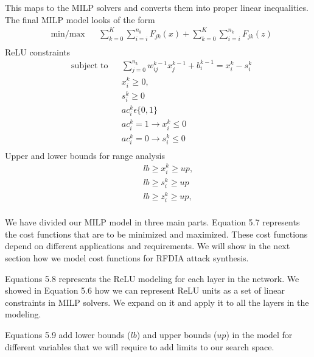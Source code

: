 This maps to the \ac{MILP} solvers and converts them into proper linear inequalities. 
The final \ac{MILP} model looks of the form
\begin{equation}
\begin{aligned}
& \underset{}{\text{min/max}}
& &  \sum_{k=0}^{K} \sum_{i=i}^{n_k}F_{jk}(x)   + \sum_{k=0}^{K} \sum_{i=i}^{n_k}F_{jk}(z)  \\
\end{aligned}
\end{equation}
ReLU constraints
\begin{equation}
\begin{aligned}
& \text{subject to} & &  \sum_{j=0}^{n_k} w_{ij}^{k-1}x_{j}^{k-1} + b_i^{k-1} = x_i^k - s_i^k  \\
& & & x_i^k \geq 0, \\
& & & s_i^k \geq 0 \\
& & & ac_i^k  \epsilon  \{0,1\} \\
& & & ac_i^k  =  1 \rightarrow  x_i^k \leq 0  \\
& & & ac_i^k =  0 \rightarrow s_i^k  \leq 0   \\
\end{aligned}
\end{equation}
Upper and lower bounds for range analysis
\begin{equation}
\begin{aligned}
& & & lb \geq x_i^k \geq up, \\
& & &  lb \geq s_i^k \geq up \\
& & & lb \geq z_i^k \geq up, \\
\end{aligned}
\end{equation}

We have divided our \ac{MILP} model in three main parts. 
Equation 5.7 represents the cost functions that are to be minimized and maximized.
These cost functions depend on different applications and requirements.  
We will show in the next section how we model cost functions for \ac{RFDIA}
attack synthesis. 

Equations 5.8 represents the ReLU modeling for each layer in the network. 
We showed in Equation 5.6 how we can represent ReLU units as a set of linear constraints in \ac{MILP} solvers. 
We expand on it and apply it to all the layers in the modeling. 

Equations 5.9 add lower bounds ($lb$) and upper bounds ($up$) in the  model for different variables that we will  require to add limits to our search space.











